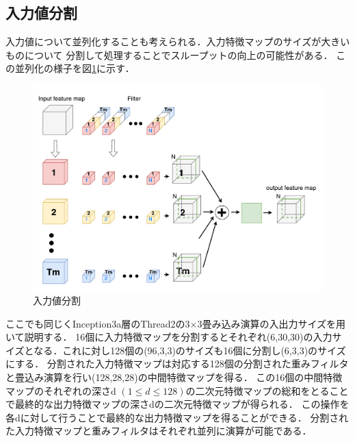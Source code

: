 {\subsection{入力値分割}
\label{subsec:para_input}
入力値について並列化することも考えられる．入力特徴マップのサイズが大きいものについて
分割して処理することでスループットの向上の可能性がある．
この並列化の様子を図\ref{fig:conv_para_input}に示す．
\begin{figure}[h]
    \centering
    \includegraphics[width=12cm]{./chap5/fig/conv_para_input.pdf}
    \caption{入力値分割}
    \label{fig:conv_para_input}
\end{figure}
ここでも同じくInception3a層のThread2の3$\times$3畳み込み演算の入出力サイズを用いて説明する．
16個に入力特徴マップを分割するとそれぞれ(6,30,30)の入力サイズとなる．これに対し128個の(96,3,3)のサイズも16個に分割し(6,3,3)のサイズにする．
分割された入力特徴マップは対応する128個の分割された重みフィルタと畳込み演算を行い(128,28,28)の中間特徴マップを得る．
この16個の中間特徴マップのそれぞれの深さd $(1 \leq d \leq 128)$の二次元特徴マップの総和をとることで最終的な出力特徴マップの深さdの二次元特徴マップが得られる．
この操作を各dに対して行うことで最終的な出力特徴マップを得ることができる．
分割された入力特徴マップと重みフィルタはそれぞれ並列に演算が可能である．

}